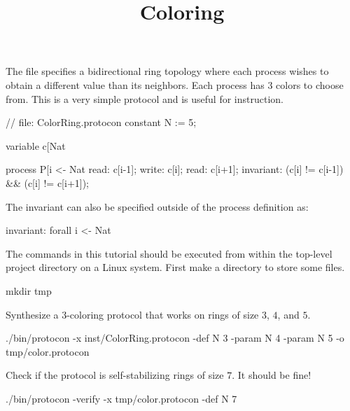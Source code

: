
\title{Coloring}
\date{}



The  file specifies a bidirectional ring topology where each process wishes to obtain a different value than its neighbors.
Each process has $3$ colors to choose from.
This is a very simple protocol and is useful for instruction.

\begin{code}
// file: ColorRing.protocon
constant N := 5;

variable c[Nat %

process P[i <- Nat %
{
  read: c[i-1];
  write: c[i];
  read: c[i+1];
  invariant: (c[i] != c[i-1]) && (c[i] != c[i+1]);
}
\end{code}
The invariant can also be specified outside of the process definition as:
\begin{code}
invariant: forall i <- Nat %
\end{code}

The commands in this tutorial should be executed from within the top-level project directory on a Linux system.
First make a directory  to store some files.
\begin{code}
mkdir tmp
\end{code}

Synthesize a 3-coloring protocol that works on rings of size $3$, $4$, and $5$.
\begin{code}
./bin/protocon -x inst/ColorRing.protocon -def N 3 -param N 4 -param N 5 -o tmp/color.protocon
\end{code}

Check if the protocol is self-stabilizing rings of size $7$. It should be fine!
\begin{code}
./bin/protocon -verify -x tmp/color.protocon -def N 7
\end{code}

